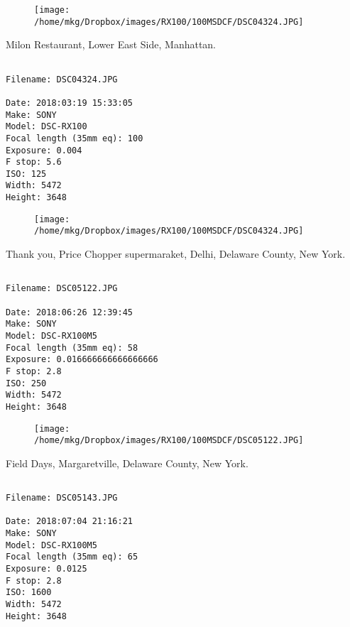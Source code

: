 \begin{figure}
\texttt{[image: /home/mkg/Dropbox/images/RX100/100MSDCF/DSC04324.JPG]}
\end{figure}
    
\clearpage
\onecolumn
\noindent Milon Restaurant, Lower East Side, Manhattan.
\noindent
\begin{lstlisting}

Filename: DSC04324.JPG

Date: 2018:03:19 15:33:05
Make: SONY
Model: DSC-RX100
Focal length (35mm eq): 100
Exposure: 0.004
F stop: 5.6
ISO: 125
Width: 5472
Height: 3648
\end{lstlisting}
\clearpage

\begin{figure}
\texttt{[image: /home/mkg/Dropbox/images/RX100/100MSDCF/DSC04324.JPG]}
\end{figure}
    
\clearpage
\onecolumn
\noindent Thank you, Price Chopper supermaraket, Delhi, Delaware County, New York.
\noindent
\begin{lstlisting}

Filename: DSC05122.JPG

Date: 2018:06:26 12:39:45
Make: SONY
Model: DSC-RX100M5
Focal length (35mm eq): 58
Exposure: 0.016666666666666666
F stop: 2.8
ISO: 250
Width: 5472
Height: 3648
\end{lstlisting}
\clearpage

\begin{figure}
\texttt{[image: /home/mkg/Dropbox/images/RX100/100MSDCF/DSC05122.JPG]}
\end{figure}
    
\clearpage
\onecolumn
\noindent Field Days, Margaretville, Delaware County, New York.
\noindent
\begin{lstlisting}

Filename: DSC05143.JPG

Date: 2018:07:04 21:16:21
Make: SONY
Model: DSC-RX100M5
Focal length (35mm eq): 65
Exposure: 0.0125
F stop: 2.8
ISO: 1600
Width: 5472
Height: 3648
\end{lstlisting}
\clearpage

